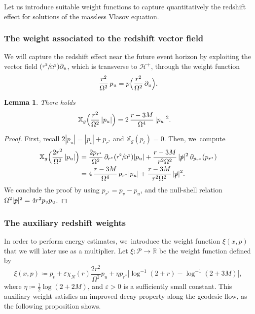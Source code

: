 \documentclass[JEP,XML,SOM,Unicode,published]{cedram}
\newcommand{\Psfrac}[2]{(\sfrac{#1}{#2})}
\let\epsilon\varepsilon
\theoremstyle{plain}
\newtheorem{lemma}[proposition]{Lemma}
\theoremstyle{definition}
\newcommand\R{{\mathbb{R}}}
\newcommand\T{{\mathbb{X}}}
\renewcommand\H{{\mathcal{H}^+}}
\begin{document}
Let us introduce suitable weight functions to capture quantitatively the redshift effect for solutions of the massless Vlasov equation.

\subsubsection{The weight associated to the redshift vector field}
We will capture the redshift effect near the future event horizon by exploiting the vector field $\Psfrac{r^2}{\Omega^2}\partial_u$, which is transverse to $\H$, through the weight function
\[
\frac{r^2}{\Omega^2}\,p_u=p\Bigl(\frac{r^2}{\Omega^2}\,\partial_u\Bigr).
\]

\begin{lemma}\label{LemRS}
There holds
\begin{align*}
\T_g \Bigl(\frac{r^2}{\Omega^2}\, |p_u| \Bigr) & = 2\,\frac{r-3M}{\Omega^4}\,|p_u|^2.
\end{align*}
\end{lemma}
\begin{proof}
First, recall $2|p_u|=|p_t|+p_{r^*}$ and $\T_g(p_t)=0$. Then, we~compute
\begin{align*}
\T_g \Bigl(\frac{2r^2}{\Omega^2}\, |p_u| \Bigr) & = \frac{2p_{r^*}}{\Omega^2}\, \partial_{r^*}(\sfrac{r^2}{\Omega^2}) |p_u| +\frac{r-3M}{r^2 \Omega^2}\, |\slashed{p}|^2\, \partial_{p_{r^*}} (p_{r^*}) \\
& = 4\,\frac{r-3M}{\Omega^4}\,p_{r^*}|p_u| + \frac{r-3M}{r^2\Omega^2}\, |\slashed{p}|^2.
\end{align*}
We conclude the proof by using $p_{r^*}=p_v-p_u$, and the null-shell relation $\Omega^2 |\slashed{p}|^2=4r^2p_vp_u$.
\end{proof}

\subsubsection{The auxiliary redshift weights}

In order to perform energy estimates, we~introduce the weight function $\xi(x,p)$ that we will later use as a multiplier. Let $\xi \colon \mathcal{P}\to \R$ be the weight function defined by
\[
\xi(x,p)\coloneqq p_t+ \epsilon \chi_N (r) \frac{2r^2}{\Omega^2} p_u +\eta p_{r^*} \bigl[ \log^{-1}(2+r) -\log^{-1}(2+3M) \bigr],
\]
where $\eta \coloneqq \frac{1}{2}\log(2+2M)$, and $\epsilon >0$ is a sufficiently small constant. This auxiliary weight satisfies an improved decay property along the geodesic flow, as the following proposition shows.
\end{document}
